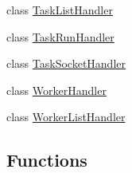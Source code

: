 \begin{DoxyCompactItemize}
\item 
class \hyperlink{classparlai_1_1mturk_1_1webapp_1_1server_1_1TaskListHandler}{Task\+List\+Handler}
\item 
class \hyperlink{classparlai_1_1mturk_1_1webapp_1_1server_1_1TaskRunHandler}{Task\+Run\+Handler}
\item 
class \hyperlink{classparlai_1_1mturk_1_1webapp_1_1server_1_1TaskSocketHandler}{Task\+Socket\+Handler}
\item 
class \hyperlink{classparlai_1_1mturk_1_1webapp_1_1server_1_1WorkerHandler}{Worker\+Handler}
\item 
class \hyperlink{classparlai_1_1mturk_1_1webapp_1_1server_1_1WorkerListHandler}{Worker\+List\+Handler}
\end{DoxyCompactItemize}
\subsection*{Functions}
